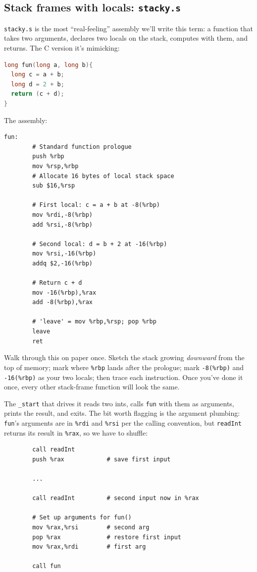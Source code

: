 \documentclass[11pt]{article}
\begin{document}
\subsection*{Stack frames with locals: \texttt{stacky.s}}

\texttt{stacky.s} is the most ``real-feeling'' assembly we'll write
this term: a function that takes two arguments, declares two locals
on the stack, computes with them, and returns. The C version it's
mimicking:
\begin{lstlisting}[language=C]
long fun(long a, long b){
  long c = a + b;
  long d = 2 + b;
  return (c + d);
}
\end{lstlisting}

The assembly:

\begin{lstlisting}
fun:
        # Standard function prologue
        push %rbp
        mov %rsp,%rbp
        # Allocate 16 bytes of local stack space
        sub $16,%rsp

        # First local: c = a + b at -8(%rbp)
        mov %rdi,-8(%rbp)
        add %rsi,-8(%rbp)

        # Second local: d = b + 2 at -16(%rbp)
        mov %rsi,-16(%rbp)
        addq $2,-16(%rbp)

        # Return c + d
        mov -16(%rbp),%rax
        add -8(%rbp),%rax

        # 'leave' = mov %rbp,%rsp; pop %rbp
        leave
        ret
\end{lstlisting}

Walk through this on paper once. Sketch the stack growing
\emph{downward} from the top of memory; mark where \texttt{\%rbp}
lands after the prologue; mark \texttt{-8(\%rbp)} and
\texttt{-16(\%rbp)} as your two locals; then trace each instruction.
Once you've done it once, every other stack-frame function will look
the same.

The \texttt{\_start} that drives it reads two ints, calls \texttt{fun}
with them as arguments, prints the result, and exits. The bit worth
flagging is the argument plumbing: \texttt{fun}'s arguments are in
\texttt{\%rdi} and \texttt{\%rsi} per the calling convention, but
\texttt{readInt} returns its result in \texttt{\%rax}, so we have to
shuffle:

\begin{lstlisting}
        call readInt
        push %rax            # save first input

        ...

        call readInt         # second input now in %rax

        # Set up arguments for fun()
        mov %rax,%rsi        # second arg
        pop %rax             # restore first input
        mov %rax,%rdi        # first arg

        call fun
\end{lstlisting}
\end{document}
